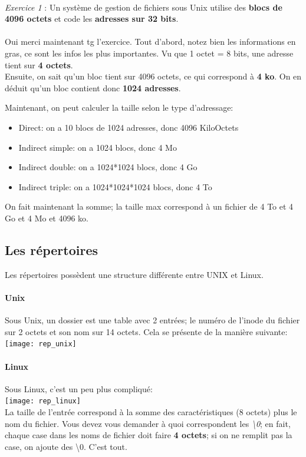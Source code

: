 \documentclass{report}
\begin{document}
\paragraph{}
\emph{Exercice 1} : Un système de gestion de fichiers sous Unix utilise des \textbf{blocs de 4096 octets} et code les \textbf{adresses sur 32 bits}.
\\
\\
Oui merci maintenant tg l'exercice. Tout d'abord, notez bien les informations en gras, ce sont les infos les plus importantes. Vu que 1 octet = 8 bits, une adresse tient sur \textbf{4 octets}. \\
Ensuite, on sait qu'un bloc tient sur 4096 octets, ce qui correspond à \textbf{4 ko}. On en déduit qu'un bloc contient donc \textbf{1024 adresses}.

Maintenant, on peut calculer la taille selon le type d'adressage:
\begin{itemize}
\item{Direct: on a 10 blocs de 1024 adresses, donc 4096 KiloOctets}
\item{Indirect simple: on a 1024 blocs, donc 4 Mo}
\item{Indirect double: on a 1024*1024 blocs, donc 4 Go}
\item{Indirect triple: on a 1024*1024*1024 blocs, donc 4 To}
\end{itemize}
On fait maintenant la somme; la taille max correspond à un fichier de 4 To et 4 Go et 4 Mo et 4096 ko.

\subsection{Les répertoires}
Les répertoires possèdent une structure différente entre UNIX et Linux.
\paragraph{Unix}
Sous Unix, un dossier est une table avec 2 entrées; le numéro de l'inode du fichier sur 2 octets et son nom sur 14 octets. Cela se présente de la manière suivante:\\
\texttt{[image: rep\_unix]}
\\
\paragraph{Linux}
Sous Linux, c'est un peu plus compliqué:\\
\texttt{[image: rep\_linux]}
\\
La taille de l'entrée correspond à la somme des caractéristiques (8 octets) plus le nom du fichier. Vous devez vous demander à quoi correspondent les \emph{\textbackslash 0}; en fait, chaque case dans les noms de fichier doit faire \textbf{4 octets}; si on ne remplit pas la case, on ajoute des \textbackslash0. C'est tout.
\end{document}
